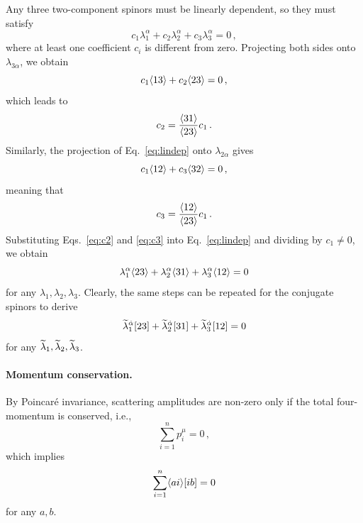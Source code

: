 Any three two-component spinors must be linearly dependent, so they must satisfy
\begin{equation}\label{eq:lindep}
    c_1\lambda_1^\alpha + c_2\lambda_2^\alpha + c_3\lambda_3^\alpha=0\,,
\end{equation}
where at least one coefficient $c_i$ is different from zero.
Projecting both sides onto $\lambda_{3\alpha}$, we obtain
\begin{equation}
    c_1\langle 1 3 \rangle+c_2 \langle 2 3 \rangle=0\,,
\end{equation}
which leads to 
\begin{equation}\label{eq:c2}
    c_2  = \frac{\langle 3 1 \rangle}{\langle 2 3 \rangle}c_1\,.
\end{equation}
Similarly, the projection of Eq.~\eqref{eq:lindep} onto $\lambda_{2\alpha}$ gives
\begin{equation}
    c_1\langle 1 2 \rangle+c_3 \langle 3 2 \rangle=0\,,
\end{equation}
meaning that
\begin{equation}\label{eq:c3}
    c_3 = \frac{\langle 1 2 \rangle}{\langle 2 3 \rangle}c_1\,.
\end{equation}
Substituting Eqs.~\eqref{eq:c2} and \eqref{eq:c3} into Eq.~\eqref{eq:lindep} and dividing by $c_1\neq 0$, we obtain
\begin{equation}\label{eq:schouten}
    \lambda_1^\alpha \langle 2 3 \rangle + \lambda_2^\alpha \langle 3 1 \rangle + \lambda_3^\alpha \langle 1 2 \rangle =0
\end{equation}
for any $\lambda_1,\lambda_2,\lambda_3$.
Clearly, the same steps can be repeated for the conjugate spinors to derive
\begin{equation}
    \widetilde{\lambda}_1^{\dot\alpha} \lbrack 2 3 \rbrack + \widetilde{\lambda}_2^{\dot\alpha} \lbrack 3 1 \rbrack+\widetilde{\lambda}_3^{\dot\alpha} \lbrack 1 2 \rbrack =0
\end{equation}
for any $\widetilde{\lambda}_1,\widetilde{\lambda}_2,\widetilde{\lambda}_3$.

\paragraph{Momentum conservation.}

By Poincaré invariance, scattering amplitudes are non-zero only if the total four-momentum is conserved, i.e.,
\begin{equation}
    \sum_{i=1}^n p_i^\mu = 0\,,
\end{equation}
which implies
\begin{equation}\label{eq:momconservation}
    \sum_{i=1}^n \langle a i \rangle\lbrack i b \rbrack = 0
\end{equation}
for any $a,b$.

